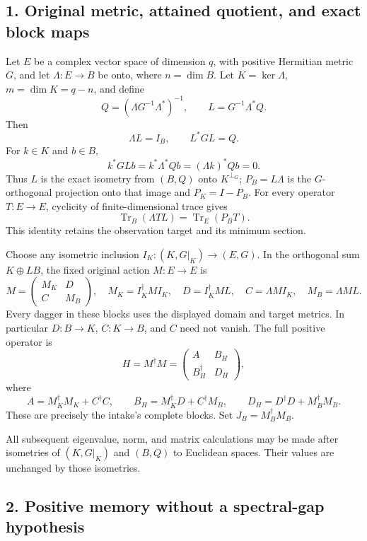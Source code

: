 \documentclass[11pt]{article}
\begin{document}
\subsection{1. Original metric, attained quotient, and exact block maps}\label{original-metric-attained-quotient-and-exact-block-maps}

Let \(E\) be a complex vector space of dimension \(q\), with positive Hermitian metric \(G\), and let \(\Lambda:E\to B\) be onto, where \(n=\dim B\). Let \(K=\ker\Lambda\), \(m=\dim K=q-n\), and define \[
 Q=(\Lambda G^{-1}\Lambda^*)^{-1},\qquad
 L=G^{-1}\Lambda^*Q.
\] Then \[
 \Lambda L=I_B,\qquad L^*GL=Q.
\] For \(k\in K\) and \(b\in B\), \[
 k^*GLb=k^*\Lambda^*Qb=(\Lambda k)^*Qb=0.
\] Thus \(L\) is the exact isometry from \((B,Q)\) onto \(K^{\perp_G}\); \(P_B=L\Lambda\) is the \(G\)-orthogonal projection onto that image and \(P_K=I-P_B\). For every operator \(T:E\to E\), cyclicity of finite-dimensional trace gives \[
 \operatorname{Tr}_B(\Lambda TL)=\operatorname{Tr}_E(P_BT).
 \tag{UH1}
\] This identity retains the observation target and its minimum section.

Choose any isometric inclusion \(I_K:(K,G|_K)\to(E,G)\). In the orthogonal sum \(K\oplus LB\), the fixed original action \(M:E\to E\) is \[
 M=
 \begin{pmatrix}M_K&D\\ C&M_B\end{pmatrix},
\quad
 M_K=I_K^\dagger MI_K,\quad D=I_K^\dagger ML,\quad
 C=\Lambda MI_K,\quad M_B=\Lambda ML.
 \tag{UH2}
\] Every dagger in these blocks uses the displayed domain and target metrics. In particular \(D:B\to K\), \(C:K\to B\), and \(C\) need not vanish. The full positive operator is \[
 H=M^\dagger M=
 \begin{pmatrix}A&B_H\\ B_H^\dagger&D_H\end{pmatrix},
 \tag{UH3}
\] where \[
 A=M_K^\dagger M_K+C^\dagger C,\qquad
 B_H=M_K^\dagger D+C^\dagger M_B,\qquad
 D_H=D^\dagger D+M_B^\dagger M_B.
 \tag{UH4}
\] These are precisely the intake's complete blocks. Set \(J_B=M_B^\dagger M_B\).

All subsequent eigenvalue, norm, and matrix calculations may be made after isometries of \((K,G|_K)\) and \((B,Q)\) to Euclidean spaces. Their values are unchanged by those isometries.

\subsection{2. Positive memory without a spectral-gap hypothesis}\label{positive-memory-without-a-spectral-gap-hypothesis}
\end{document}
